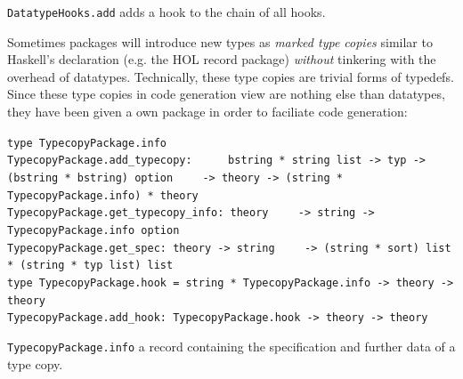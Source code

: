 \begin{isabellebody}
\begin{isamarkuptext}
\begin{description}
  \item \verb|DatatypeHooks.add| adds a hook to the
     chain of all hooks.

  \end{description}%
\end{isamarkuptext}%
\isamarkuptrue%
%
\endisatagmlref
{\isafoldmlref}%
%
\isadelimmlref
%
\endisadelimmlref
%
\isamarkuptrue%
%
\begin{isamarkuptext}%
Sometimes packages will introduce new types
  as \emph{marked type copies} similar to Haskell's
   declaration (e.g. the HOL record package)
  \emph{without} tinkering with the overhead of datatypes.
  Technically, these type copies are trivial forms of typedefs.
  Since these type copies in code generation view are nothing
  else than datatypes, they have been given a own package
  in order to faciliate code generation:%
\end{isamarkuptext}%
\isamarkuptrue%
%
\isadelimmlref
%
\endisadelimmlref
%
\isatagmlref
%
\begin{isamarkuptext}%
\begin{mldecls}
  \verb|type TypecopyPackage.info| \\
  \verb|TypecopyPackage.add_typecopy: |\isasep\isanewline%
\verb|    bstring * string list -> typ -> (bstring * bstring) option|\isasep\isanewline%
\verb|    -> theory -> (string * TypecopyPackage.info) * theory| \\
  \verb|TypecopyPackage.get_typecopy_info: theory|\isasep\isanewline%
\verb|    -> string -> TypecopyPackage.info option| \\
  \verb|TypecopyPackage.get_spec: theory -> string|\isasep\isanewline%
\verb|    -> (string * sort) list * (string * typ list) list| \\
  \verb|type TypecopyPackage.hook = string * TypecopyPackage.info -> theory -> theory| \\
  \verb|TypecopyPackage.add_hook: TypecopyPackage.hook -> theory -> theory| \\
  \end{mldecls}

  \begin{description}

  \item \verb|TypecopyPackage.info| a record containing
     the specification and further data of a type copy.


\end{description}
\end{isamarkuptext}
\end{isabellebody}
